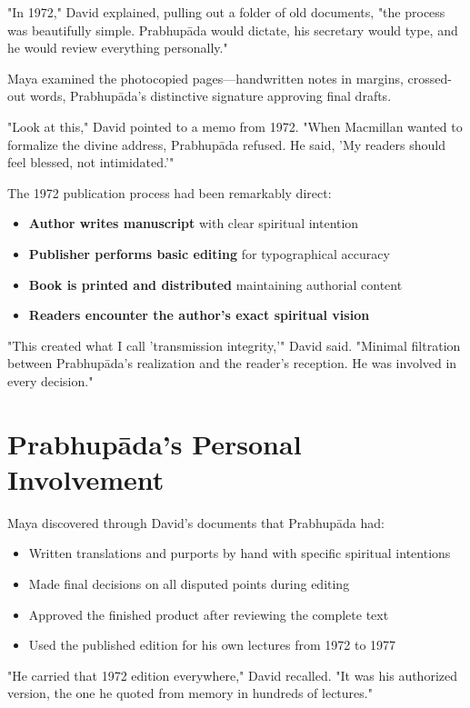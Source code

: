 \documentclass[11pt,twoside]{book}
\begin{document}
"In 1972," David explained, pulling out a folder of old documents, "the process was beautifully simple. Prabhupāda would dictate, his secretary would type, and he would review everything personally."

Maya examined the photocopied pages—handwritten notes in margins, crossed-out words, Prabhupāda's distinctive signature approving final drafts.

"Look at this," David pointed to a memo from 1972. "When Macmillan wanted to formalize the divine address, Prabhupāda refused. He said, 'My readers should feel blessed, not intimidated.'"

The 1972 publication process had been remarkably direct:
\begin{itemize}
\item \textbf{\textbf{Author writes manuscript}} with clear spiritual intention
\item \textbf{\textbf{Publisher performs basic editing}} for typographical accuracy
\item \textbf{\textbf{Book is printed and distributed}} maintaining authorial content
\item \textbf{\textbf{Readers encounter the author's exact spiritual vision}}
\end{itemize}

"This created what I call 'transmission integrity,'" David said. "Minimal filtration between Prabhupāda's realization and the reader's reception. He was involved in every decision."
\section*{Prabhupāda's Personal Involvement}
\label{sec:orge2d317a}

Maya discovered through David's documents that Prabhupāda had:
\begin{itemize}
\item Written translations and purports by hand with specific spiritual intentions
\item Made final decisions on all disputed points during editing
\item Approved the finished product after reviewing the complete text
\item Used the published edition for his own lectures from 1972 to 1977
\end{itemize}

"He carried that 1972 edition everywhere," David recalled. "It was his authorized version, the one he quoted from memory in hundreds of lectures."
\end{document}
